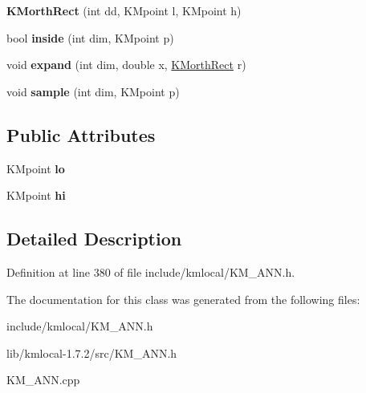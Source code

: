 \begin{DoxyCompactItemize}
\item 
\hypertarget{class_k_morth_rect_aeed0dd407def4673f5933fd314ecd37e}{
{\bfseries KMorthRect} (int dd, KMpoint l, KMpoint h)}
\label{class_k_morth_rect_aeed0dd407def4673f5933fd314ecd37e}

\item 
\hypertarget{class_k_morth_rect_a8a4689ef509e82b97f1d3e15375c5599}{
bool {\bfseries inside} (int dim, KMpoint p)}
\label{class_k_morth_rect_a8a4689ef509e82b97f1d3e15375c5599}

\item 
\hypertarget{class_k_morth_rect_a3cbf082e32cb3476354e71454b8ec803}{
void {\bfseries expand} (int dim, double x, \hyperlink{class_k_morth_rect}{KMorthRect} r)}
\label{class_k_morth_rect_a3cbf082e32cb3476354e71454b8ec803}

\item 
\hypertarget{class_k_morth_rect_ace4676ba25c69020932b96bcb63383dc}{
void {\bfseries sample} (int dim, KMpoint p)}
\label{class_k_morth_rect_ace4676ba25c69020932b96bcb63383dc}

\end{DoxyCompactItemize}
\subsection*{Public Attributes}
\begin{DoxyCompactItemize}
\item 
\hypertarget{class_k_morth_rect_ae04320eda04b424ca9a535a198d7be86}{
KMpoint {\bfseries lo}}
\label{class_k_morth_rect_ae04320eda04b424ca9a535a198d7be86}

\item 
\hypertarget{class_k_morth_rect_ac1eeb15088f07b7bd8a236e56bbabfa9}{
KMpoint {\bfseries hi}}
\label{class_k_morth_rect_ac1eeb15088f07b7bd8a236e56bbabfa9}

\end{DoxyCompactItemize}


\subsection{Detailed Description}


Definition at line 380 of file include/kmlocal/KM\_\-ANN.h.



The documentation for this class was generated from the following files:\begin{DoxyCompactItemize}
\item 
include/kmlocal/KM\_\-ANN.h\item 
lib/kmlocal-\/1.7.2/src/KM\_\-ANN.h\item 
KM\_\-ANN.cpp\end{DoxyCompactItemize}
